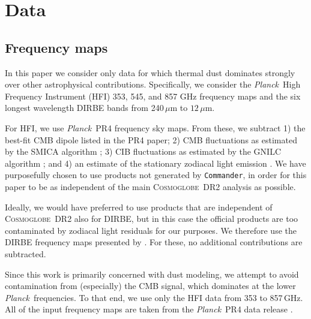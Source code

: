 \documentclass{aa}
\def\Cosmoglobe{\textsc{Cosmoglobe}}
\def\Planck{\textit{Planck}}
\def\commander{\texttt{Commander}}
\begin{document}
\section{Data}
\label{sec:data}

\subsection{Frequency maps}

In this paper we consider only data for which thermal dust dominates
strongly over other astrophysical contributions. Specifically, we
consider the \Planck\ High Frequency Instrument (HFI) 353, 545, and
857 GHz frequency maps \citep{planck2016-l03} and the six longest
wavelength DIRBE bands from 240\,$\mu\mathrm m$ to $12\,\mu\mathrm m$.

For HFI, we use \Planck\ PR4 \citep{npipe} frequency sky maps. From
these, we subtract 1) the best-fit CMB dipole listed in the PR4 paper;
2) CMB fluctuations as estimated by the SMICA algorithm
\citep{planck2016-l04}; 3) CIB fluctuations as estimated by the GNILC
algorithm \citep{planck2016-XLVIII}; and 4) an estimate of the
stationary zodiacal light emission \citep{planck2013-pip88}. We have
purposefully chosen to use products not generated by \commander, in
order for this paper to be as independent of the main \Cosmoglobe\ DR2
analysis as possible.

Ideally, we would have preferred to use products that are independent
of \Cosmoglobe\ DR2 also for DIRBE, but in this case the official
products are too contaminated by zodiacal light residuals for our
purposes. We therefore use the DIRBE frequency maps presented by
\citet{CG02_01}. For these, no additional
contributions are subtracted.

Since this work is primarily concerned with dust modeling, we attempt to avoid
contamination from (especially) the CMB signal, which dominates at the
lower \Planck\ frequencies. To that end, we use only the HFI data from
353 to 857\,GHz. All of the input frequency maps are taken from the \Planck\ PR4 data release
\citep{npipe}.
\end{document}
